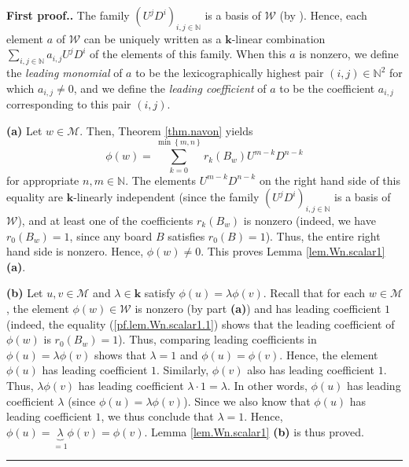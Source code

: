 \documentclass[numbers=enddot,12pt,final,onecolumn,notitlepage]{scrartcl}%
\theoremstyle{definition}
\newenvironment{proof}[1][Proof]{\noindent\textbf{#1.} }{\ \rule{0.5em}{0.5em}}
\newcommand{\W}{\mathcal{W}}
\newcommand{\M}{\mathcal{M}}
\newcommand{\kk}{\mathbf{k}}
\newcommand{\NN}{\mathbb{N}}
\newenvironment{verlong}{}{}
\newenvironment{vershort}{}{}
\begin{document}
\begin{proof}[First proof.]
The family $\left(  U^{j}D^{i}\right)  _{i,j\in\NN}$ is a
basis of $\W$ (by \cite[Proposition 2.7.1 (i)]{Etingof}). Hence, each
element $a$ of $\W$ can be uniquely written as a $\kk$-linear
combination $\sum\limits_{i,j\in\NN}a_{i,j}U^{j}D^{i}$ of the elements of this
family. When this $a$ is nonzero, we define the \emph{leading monomial} of $a$
to be the lexicographically highest pair $\left(  i,j\right)  \in
\NN^2$ for which $a_{i,j}\neq0$, and we define the \emph{leading
coefficient} of $a$ to be the coefficient $a_{i,j}$ corresponding to this pair
$\left(  i,j\right)  $. \medskip

\textbf{(a)} Let $w\in\M$. Then, Theorem \ref{thm.navon} yields
\begin{equation}
\phi\left(  w\right)  =\sum_{k=0}^{\min\left\{  m,n\right\}  }r_{k}\left(
B_{w}\right)  U^{m-k}D^{n-k} \label{pf.lem.Wn.scalar1.1}%
\end{equation}
for appropriate $n,m\in\NN$. The elements $U^{m-k}D^{n-k}$ on the right
hand side of this equality are $\kk$-linearly independent (since the
family $\left(  U^{j}D^{i}\right)  _{i,j\in\NN}$ is a basis of
$\W$), and at least one of the coefficients $r_{k}\left(
B_{w}\right)  $ is nonzero (indeed, we have $r_{0}\left(  B_{w}\right)  =1$,
since any board $B$ satisfies $r_{0}\left(  B\right)  =1$). Thus, the entire
right hand side is nonzero. Hence, $\phi\left(  w\right)  \neq0$. This proves
Lemma \ref{lem.Wn.scalar1} \textbf{(a)}. \medskip

\textbf{(b)} Let $u,v\in\M$ and $\lambda\in\kk$ satisfy
$\phi\left(  u\right)  =\lambda\phi\left(  v\right)  $. Recall that for each
$w\in\M$, the element $\phi\left(  w\right)  \in\W$ is
nonzero (by part \textbf{(a)}) and has leading coefficient $1$ (indeed, the
equality (\ref{pf.lem.Wn.scalar1.1}) shows that the leading coefficient of
$\phi\left(  w\right)  $ is $r_{0}\left(  B_{w}\right)  =1$).
\begin{vershort}
Thus, comparing leading coefficients in
$\phi\left(  u\right)  =\lambda\phi\left(  v\right)  $
shows that $\lambda = 1$ and $\phi\left(  u\right)  =\phi\left(  v\right)$.
\end{vershort}
\begin{verlong}
Hence, the
element $\phi\left(  u\right)  $ has leading coefficient $1$. Similarly,
$\phi\left(  v\right)  $ also has leading coefficient $1$. Thus, $\lambda
\phi\left(  v\right)  $ has leading coefficient $\lambda\cdot1=\lambda$. In
other words, $\phi\left(  u\right)  $ has leading coefficient $\lambda$ (since
$\phi\left(  u\right)  =\lambda\phi\left(  v\right)  $). Since we also know
that $\phi\left(  u\right)  $ has leading coefficient $1$, we thus conclude
that $\lambda=1$. Hence, $\phi\left(  u\right)  =\underbrace{\lambda}_{=1}%
\phi\left(  v\right)  =\phi\left(  v\right)  $.
Lemma \ref{lem.Wn.scalar1} \textbf{(b)} is thus proved.
\end{verlong}
\end{proof}
\end{document}
